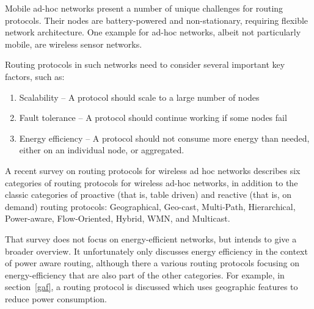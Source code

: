 Mobile ad-hoc networks present a number of unique challenges for routing protocols.
Their nodes are battery-powered and non-stationary, requiring flexible network architecture.
One example for ad-hoc networks, albeit not particularly mobile, are wireless sensor networks.

Routing protocols in such networks need to consider several important key
factors, such as:
\begin{enumerate}
   \item Scalability -- A protocol should scale to a large number of nodes
   \item Fault tolerance -- A protocol should continue working if some nodes fail
   \item Energy efficiency -- A protocol should not consume more energy than needed,
   either on an individual node, or aggregated.
\end{enumerate}

A recent survey\cite{alotaibi2012survey} on routing protocols for wireless
ad hoc networks describes six categories of routing protocols for wireless
ad-hoc networks,  in addition to the classic categories of proactive (that is, table driven)
and reactive (that is, on demand) routing protocols:
  Geographical, Geo-cast, Multi-Path, Hierarchical, Power-aware, Flow-Oriented,
  Hybrid, WMN, and Multicast.

That survey does not focus on energy-efficient networks, but intends to give
a broader overview. It unfortunately only discusses energy efficiency in the
context of power aware routing, although there a various routing protocols
focusing on energy-efficiency that are also part of the other categories.
For example, in section~\ref{gaf}, a routing protocol is discussed which
uses geographic features to reduce power consumption.
